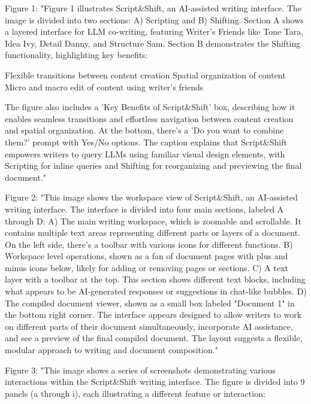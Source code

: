 Figure 1: "Figure 1 illustrates Script&Shift, an AI-assisted writing interface. The image is divided into two sections: A) Scripting and B) Shifting.
Section A shows a layered interface for LLM co-writing, featuring Writer's Friends like Tone Tara, Idea Ivy, Detail Danny, and Structure Sam.
Section B demonstrates the Shifting functionality, highlighting key benefits:

Flexible transitions between content creation
Spatial organization of content
Micro and macro edit of content using writer's friends

The figure also includes a 'Key Benefits of Script&Shift' box, describing how it enables seamless transitions and effortless navigation between content creation and spatial organization.
At the bottom, there's a 'Do you want to combine them?' prompt with Yes/No options.
The caption explains that Script&Shift empowers writers to query LLMs using familiar visual design elements, with Scripting for inline queries and Shifting for reorganizing and previewing the final document."






Figure 2: "This image shows the workspace view of Script&Shift, an AI-assisted writing interface. The interface is divided into four main sections, labeled A through D:
A) The main writing workspace, which is zoomable and scrollable. It contains multiple text areas representing different parts or layers of a document. On the left side, there's a toolbar with various icons for different functions.
B) Workspace level operations, shown as a fan of document pages with plus and minus icons below, likely for adding or removing pages or sections.
C) A text layer with a toolbar at the top. This section shows different text blocks, including what appears to be AI-generated responses or suggestions in chat-like bubbles.
D) The compiled document viewer, shown as a small box labeled "Document 1" in the bottom right corner.
The interface appears designed to allow writers to work on different parts of their document simultaneously, incorporate AI assistance, and see a preview of the final compiled document. The layout suggests a flexible, modular approach to writing and document composition."

Figure 3: "This image shows a series of screenshots demonstrating various interactions within the Script&Shift writing interface. The figure is divided into 9 panels (a through i), each illustrating a different feature or interaction:

